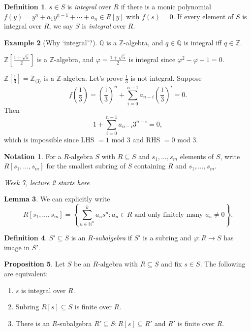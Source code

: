 \documentclass[a4paper]{article}
\newcommand{\la}{\langle}
\newcommand{\ra}{\rangle}
\newcommand{\Z}{\mathbb Z}
\newcommand{\Q}{\mathbb Q}
\newcommand{\Mod}{\text{ mod }}
\theoremstyle{definition}
\newtheorem{defn}{Definition}[subsection]
\newtheorem{prop}[defn]{Proposition}
\newtheorem{lemma}[defn]{Lemma}
\newtheorem{example}[defn]{Example}
\newtheorem*{notation}{Notation}
\begin{document}
\begin{defn}
$s\in S$ is \textit{integral} over $R$ if there is a monic polynomial $f(y)=y^n+a_1y^{n-1}+\cdots+a_n\in R[y]$ with $f(s)=0$. If every element of $S$ is integral over $R$, we say $S$ is \textit{integral} over $R$.
\end{defn}
\begin{example}[Why `integral'?]
$\Q$ is a $\Z$-algebra, and $q\in\Q$ is integral iff $q\in\Z$.

$\Z\left[\frac{1+\sqrt5}{2}\right]$ is a $\Z$-algebra, and $\varphi=\frac{1+\sqrt5}{2}$ is integral since $\varphi^2-\varphi-1=0$.

$\Z\left[\frac13\right]=\Z_{\la3\ra}$ is a $\Z$-algebra. Let's prove $\frac13$ is not integral. Suppose
\[
f\left(\frac13\right)=\left(\frac13\right)^n+\sum_{i=0}^{n-1} a_{n-i}\left(\frac13\right)^i=0.
\]
Then
\[
1+\sum_{i=0}^{n-1}a_{n-i}3^{n-i}=0,
\]
which is impossible since LHS $=1\Mod 3$ and RHS $=0\Mod 3$.
\end{example}

\begin{notation}
For a $R$-algebra $S$ with $R\subseteq S$ and $s_1,\ldots,s_m$ elements of $S$, write $R[s_1,\ldots,s_m]$ for the smallest subring of $S$ containing $R$ and $s_1,\ldots,s_m$.
\end{notation}

\begin{flushright}
\textit{Week 7, lecture 2 starts here}
\end{flushright}

\begin{lemma}
We can explicitly write
\[
R[s_1,\ldots,s_m]=\left\{ \sum_{u\in\mathbb N^n}^k a_u s^u:a_u\in R \text{ and only finitely many } a_u\neq 0\right\}.
\]
\end{lemma}

\begin{defn}
$S'\subseteq S$ is an $R$\textit{-subalgebra} if $S'$ is a subring and $\varphi:R\rightarrow S$ has image in $S'$.
\end{defn}

\begin{prop}
\label{prop:sintthenRsfinite}
Let $S$ be an $R$-algebra with $R\subseteq S$ and fix $s\in S$. The following are equivalent:
\begin{enumerate}
\item $s$ is integral over $R$.
\item Subring $R[s]\subseteq S$ is finite over $R$.
\item There is an $R$-subalgebra $R'\subseteq S:R[s]\subseteq R'$ and $R'$ is finite over $R$.
\end{enumerate}
\end{prop}
\end{document}
